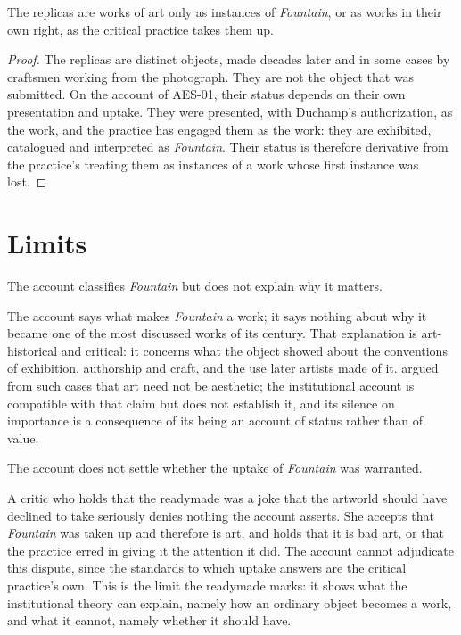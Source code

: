 \documentclass{situationist-preprint}
\begin{document}
\begin{proposition}\label{p:replica}
The replicas are works of art only as instances of \emph{Fountain}, or as works in their own right, as the critical practice takes them up.
\end{proposition}

\begin{proof}
The replicas are distinct objects, made decades later and in some cases by craftsmen working from the photograph. They are not the object that was submitted. On the account of AES-01, their status depends on their own presentation and uptake. They were presented, with Duchamp's authorization, as the work, and the practice has engaged them as the work: they are exhibited, catalogued and interpreted as \emph{Fountain}. Their status is therefore derivative from the practice's treating them as instances of a work whose first instance was lost.
\end{proof}

\section{Limits}

\begin{remark}\label{r:import}
The account classifies \emph{Fountain} but does not explain why it matters.
\end{remark}

The account says what makes \emph{Fountain} a work; it says nothing about why it became one of the most discussed works of its century. That explanation is art-historical and critical: it concerns what the object showed about the conventions of exhibition, authorship and craft, and the use later artists made of it. \citet{Binkley1977} argued from such cases that art need not be aesthetic; the institutional account is compatible with that claim but does not establish it, and its silence on importance is a consequence of its being an account of status rather than of value.

\begin{remark}\label{r:warrant}
The account does not settle whether the uptake of \emph{Fountain} was warranted.
\end{remark}

A critic who holds that the readymade was a joke that the artworld should have declined to take seriously denies nothing the account asserts. She accepts that \emph{Fountain} was taken up and therefore is art, and holds that it is bad art, or that the practice erred in giving it the attention it did. The account cannot adjudicate this dispute, since the standards to which uptake answers are the critical practice's own. This is the limit the readymade marks: it shows what the institutional theory can explain, namely how an ordinary object becomes a work, and what it cannot, namely whether it should have.
\end{document}
